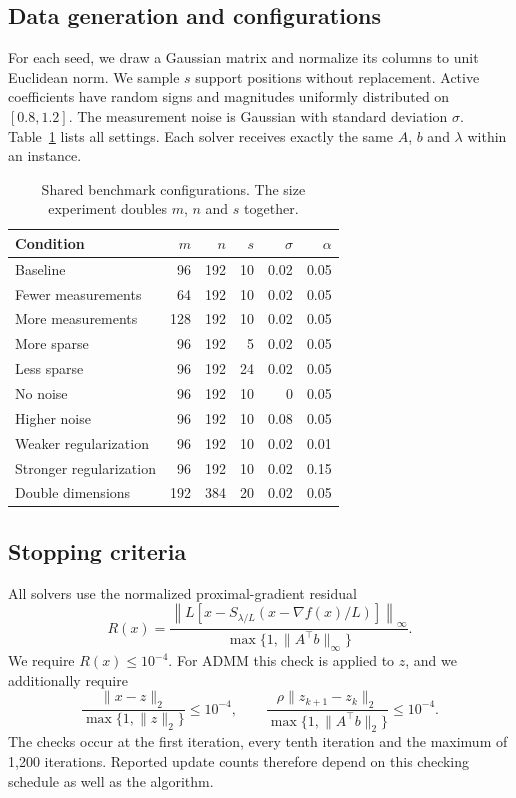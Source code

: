 \documentclass{article}
\begin{document}
\subsection{Data generation and configurations}
For each seed, we draw a Gaussian matrix and normalize its columns to unit Euclidean norm. We sample $s$ support positions without replacement. Active coefficients have random signs and magnitudes uniformly distributed on $[0.8,1.2]$. The measurement noise is Gaussian with standard deviation $\sigma$. Table~\ref{tab:configs} lists all settings. Each solver receives exactly the same $A$, $b$ and $\lambda$ within an instance.
\begin{table}[htbp]
\caption{Shared benchmark configurations. The size experiment doubles $m$, $n$ and $s$ together.}\label{tab:configs}
\centering\small
\begin{tabular}{lrrrrr}\toprule
Condition & $m$ & $n$ & $s$ & $\sigma$ & $\alpha$\\\midrule
Baseline &96&192&10&0.02&0.05\\
Fewer measurements &64&192&10&0.02&0.05\\
More measurements &128&192&10&0.02&0.05\\
More sparse &96&192&5&0.02&0.05\\
Less sparse &96&192&24&0.02&0.05\\
No noise &96&192&10&0&0.05\\
Higher noise &96&192&10&0.08&0.05\\
Weaker regularization &96&192&10&0.02&0.01\\
Stronger regularization &96&192&10&0.02&0.15\\
Double dimensions &192&384&20&0.02&0.05\\\bottomrule
\end{tabular}
\end{table}

\subsection{Stopping criteria}
All solvers use the normalized proximal-gradient residual
\begin{equation}
 R(x)=\frac{\left\|L\left[x-S_{\lambda/L}\!\left(x-\nabla f(x)/L\right)\right]\right\|_\infty}
 {\max\{1,\|A^\top b\|_\infty\}}.
\end{equation}
We require $R(x)\le10^{-4}$. For ADMM this check is applied to $z$, and we additionally require
\begin{equation}
 \frac{\|x-z\|_2}{\max\{1,\|z\|_2\}}\le10^{-4},\qquad
 \frac{\rho\|z_{k+1}-z_k\|_2}{\max\{1,\|A^\top b\|_2\}}\le10^{-4}.
\end{equation}
The checks occur at the first iteration, every tenth iteration and the maximum of 1,200 iterations. Reported update counts therefore depend on this checking schedule as well as the algorithm.
\end{document}
